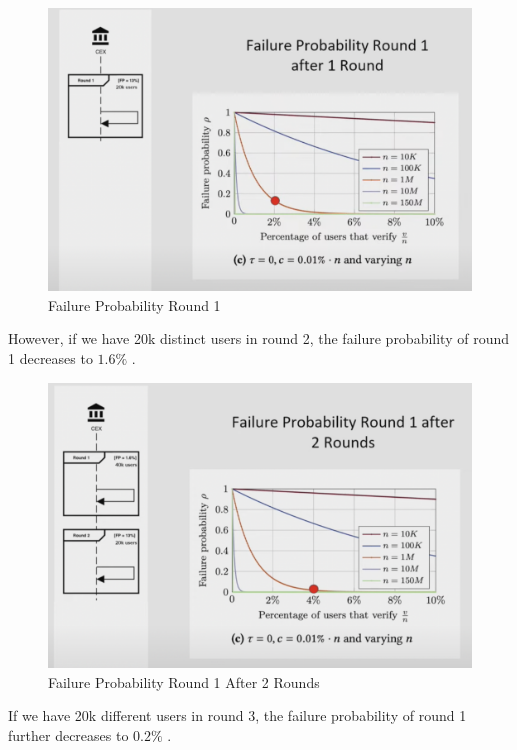 \begin{figure}[H]
   \centering
   \includegraphics[width=130mm]{FailureProbabilityRound1.png}
   \caption{Failure Probability Round 1 \cite{NS23}}
   \label{overflow}
   \end{figure}


However, if we have 20k distinct users in round 2, the failure probability of round 1 decreases to $1.6\%$ .


\begin{figure}[H]
   \centering
   \includegraphics[width=130mm]{FailureProbabilityRound2.png}
   \caption{Failure Probability Round 1 After 2 Rounds\cite{NS23}}
   \label{overflow}
   \end{figure}


If we have 20k different users in round 3, the failure probability of round 1 further decreases to $0.2\%$ .


